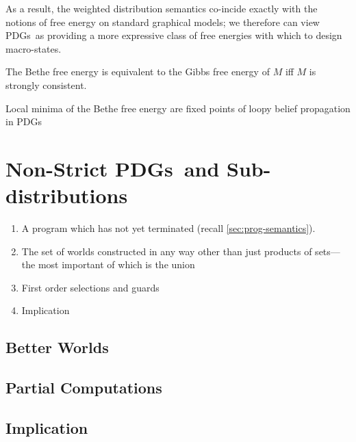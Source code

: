 \documentclass{article}
\newcommand{\MN}{PDG}
\newcommand{\MNs}{\MN s}
\begin{document}
	As a result, the weighted distribution semantics co-incide exactly with the notions of free energy on standard graphical models; we therefore can view \MNs\ as providing a more expressive class of free energies with which to design macro-states.
	
	\begin{conj}
		The Bethe free energy is equivalent to the Gibbs free energy of $M$ iff $M$ is strongly consistent.
	\end{conj}
	\begin{coro}
		Local minima of the Bethe free energy are fixed points of loopy belief propagation in \MNs		
	\end{coro}

	

		

	\section{Non-Strict \MNs\ and Sub-distributions} \label{sec:full-model}
	
	
	\begin{enumerate}
		\item A program which has not yet terminated (recall \cref{sec:prog-semantics}).
		\item The set of worlds constructed in any way other than just products of sets---the most important of which is the union
		\item First order selections and guards
		\item Implication
	\end{enumerate}


	\subsection{Better Worlds}
	\subsection{Partial Computations}
	\subsection{Implication}
	
	
\end{document}
